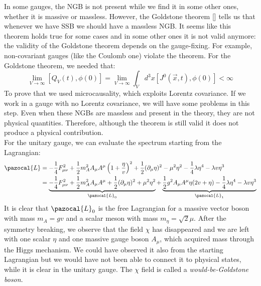 \documentclass[../main.tex]{subfiles}
\begin{document}
In some gauges, the NGB is not present while we find it in some other ones, whether it is massive or massless. However, the Goldstone theorem [] tells us that whenever we have SSB we should have a massless NGB. It seems like this theorem holds true for some cases and in some other ones it is not valid anymore: the validity of the Goldstone theorem depends on the gauge-fixing. For example, non-covariant gauges (like the Coulomb one) violate the theorem. For the Goldstone theorem, we needed that:
\[
\lim_{V\to\infty}[Q_V(t),\phi(0)]=\lim_{V\to\infty}\int_Vd^3x[J^0(\Vec{x},t),\phi(0)]<\infty
\]
To prove that we used microcausality, which exploits Lorentz covariance. If we work in a gauge with no Lorentz covariance, we will have some problems in this step. Even when these NGBs are massless and present in the theory, they are not physical quantities. Therefore, although the theorem is still valid it does not produce a physical contribution.\\
For the unitary gauge, we can evaluate the spectrum starting from the Lagrangian:
\begin{align*}
\pazocal{L}&=-\frac{1}{4}F_{\mu\nu}^2+\frac{1}{2}m_A^2A_\mu A^\mu\left(1+\frac{\eta}{v}\right)^2+\frac{1}{2}(\partial_\mu\eta)^2
-\mu^2\eta^2-\frac{1}{4}\lambda\eta^4-\lambda v\eta^3\\
&=\underbrace{-\frac{1}{4}F_{\mu\nu}^2+\frac{1}{2}m_A^2A_\mu A^\mu+\frac{1}{2}(\partial_\mu\eta)^2+\mu^2\eta^2}_{\pazocal{L}_0}+\underbrace{\frac{1}{2}g^2A_\mu A^\mu\eta(2v+\eta)-\frac{1}{4}\lambda\eta^4-\lambda v\eta^3}_{\pazocal{L}_1}
\end{align*}
It is clear that $\pazocal{L}_0$ is the free Lagrangian for a massive vector boson with mass $m_A=gv$ and a scalar meson with mass $m_\eta=\sqrt{2}\mu$. After the symmetry breaking, we observe that the field $\chi$ has disappeared and we are left with one scalar $\eta$ and one massive gauge boson $A_\mu$, which acquired mass through the Higgs mechanism. We could have observed it also from the starting Lagrangian but we would have not been able to connect it to physical states, while it is clear in the unitary gauge. The $\chi$ field is called a \textit{would-be-Goldstone boson}.
\end{document}

